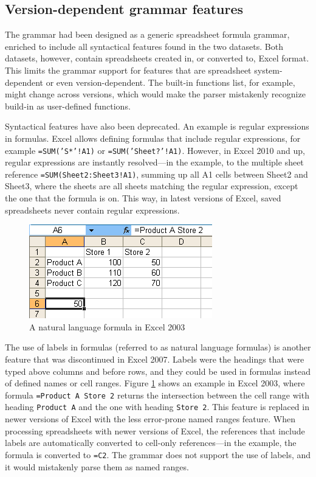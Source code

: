 \documentclass[conference]{IEEEtran}
\begin{document}
\subsection{Version-dependent grammar features}
The grammar had been designed as a generic spreadsheet formula grammar, enriched to include all syntactical features found in the two datasets. Both datasets, however, contain spreadsheets created in, or converted to, Excel format. This limits the grammar support for features that are spreadsheet system-dependent or even version-dependent. The built-in functions list, for example, might change across versions, which would make the parser mistakenly recognize build-in as user-defined functions.

Syntactical features have also been deprecated. An example is regular expressions in formulas. Excel allows defining formulas that include regular expressions, for example \texttt{=SUM('S*'!A1)} or \texttt{=SUM('Sheet?'!A1)}. However, in Excel 2010 and up, regular expressions are instantly resolved---in the example, to the multiple sheet reference \texttt{=SUM(Sheet2:Sheet3!A1)}, summing up all A1 cells between Sheet2 and Sheet3, where the sheets are all sheets matching the regular expression, except the one that the formula is on. This way, in latest versions of Excel, saved spreadsheets never contain regular expressions.
\begin{figure}
	\caption{A natural language formula in Excel 2003}
	\label{fig:labels}
	\centering
	\includegraphics{labels}
\end{figure}

The use of labels in formulas (referred to as natural language formulas) is another feature that was discontinued in Excel 2007. Labels were the headings that were typed above columns and before rows, and they could be used in formulas instead of defined names or cell ranges. Figure \ref{fig:labels} shows an example in Excel 2003, where formula \texttt{=Product A Store 2} returns the intersection between the cell range with heading \texttt{Product A} and the one with heading \texttt{Store 2}. This feature is replaced in newer versions of Excel with the less error-prone named ranges feature. When processing spreadsheets with newer versions of Excel, the references that include labels are automatically converted to cell-only references---in the example, the formula is converted to \texttt{=C2}. The grammar does not support the use of labels, and it would mistakenly parse them as named ranges.
\end{document}
